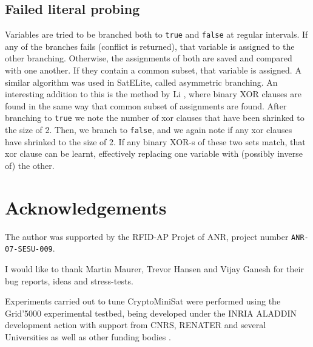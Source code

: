 \documentclass[final]{ieee}
\begin{document}
\subsection{Failed literal probing}
Variables are tried to be branched both to \texttt{true} and \texttt{false} at regular intervals. If any of the branches fails (conflict is returned), that variable is assigned to the other branching. Otherwise, the assignments of both are saved and compared with one another. If they contain a common subset, that variable is assigned. A similar algorithm was used in SatELite, called asymmetric branching. An interesting addition to this is the method by Li \cite{DBLP:journals/dam/Li03}, where binary XOR clauses are found in the same way that common subset of assignments are found. After branching to \texttt{true} we note the number of xor clauses that have been shrinked to the size of 2. Then, we branch to \texttt{false}, and we again note if any xor clauses have shrinked to the size of 2. If any binary XOR-s of these two sets match, that xor clause can be learnt, effectively replacing one variable with (possibly inverse of) the other.

\section*{Acknowledgements}
The author was supported by the RFID-AP Projet of ANR, project number \texttt{ANR-07-SESU-009}.

I would like to thank Martin Maurer, Trevor Hansen and Vijay Ganesh for their bug reports, ideas and stress-tests.

Experiments carried out to tune CryptoMiniSat were performed using the Grid'5000
experimental testbed, being developed under the INRIA ALADDIN development 
action with support from CNRS, RENATER and several Universities as well 
as other funding bodies \cite{Grid5000}.





\vfill
\pagebreak
\end{document}
